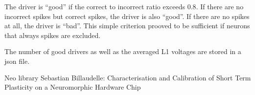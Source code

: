 \documentclass[a4paper]{article}
\begin{document}
The driver is ``good'' if the correct to incorrect ratio exceeds
$0.8$. If there are no incorrect spikes but correct spikes, the driver
is also ``good''. If there are no spikes at all, the driver is
``bad''.  This simple criterion prooved to be sufficient if neurons
that always spikes are excluded.

The number of good drivers as well as the averaged L1 voltages are
stored in a json file.

\begin{thebibliography}{99}
   Neo library
   Sebastian Billaudelle: Characterisation and
    Calibration of Short Term Plasticity on a Neuromorphic Hardware
    Chip
\end{thebibliography}
\end{document}
